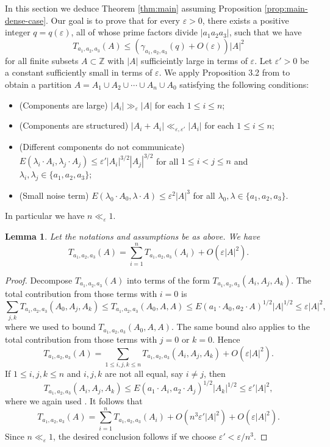 \documentclass[12pt, notitlepage]{amsart}
\numberwithin{equation}{section}
\def\Z{\mathbb Z}
\newcommand{\eps}{\varepsilon}
\newtheorem{lemma}[theorem]{Lemma}
\theoremstyle{remark}
\theoremstyle{definition}
\theoremstyle{remark}
\numberwithin{equation}{section}
\begin{document}
In this section we deduce Theorem \ref{thm:main} assuming Proposition \ref{prop:main-dense-case}. Our goal is to prove that for every $\eps > 0$, there exists a positive integer $q = q(\eps)$, all of whose prime factors divide $|a_1a_2a_3|$, such that we have
$$
T_{a_1,a_2,a_3}(A) \leq (\gamma_{a_1,a_2,a_3}(q) + O(\eps)) |A|^2
$$
for all finite subsets $A \subset \Z$ with $|A|$ sufficieintly large in terms of $\eps$.
Let $\eps'>0$ be a constant sufficiently small in terms of $\eps$. We apply Proposition 3.2 from \cite{green2008maximal} to obtain a partition $A = A_1 \cup A_2 \cup \cdots \cup A_n \cup A_0$ satisfying the following conditions:
\begin{itemize}
\item (Components are large) $|A_i| \gg_{\eps} |A|$ for each $1 \leq i \leq n$;
\item (Components are structured) $|A_i+A_i| \ll_{\eps,\eps'} |A_i|$ for each $1 \leq i \leq n$;
\item (Different components do not communicate) $E(\lambda_i\cdot A_i, \lambda_j \cdot A_j) \leq \eps' |A_i|^{3/2}|A_j|^{3/2}$ for all $1 \leq i < j \leq n$ and $\lambda_i,\lambda_j \in \{a_1, a_2, a_3\}$;
\item (Small noise term) $E(\lambda_0\cdot A_0, \lambda \cdot A) \leq \eps^2 |A|^3$ for all $\lambda_0,\lambda \in \{a_1, a_2, a_3\}$.
\end{itemize}
In particular we have $n \ll_{\eps} 1$.

\begin{lemma}\label{lem:TA-TAi}
Let the notations and assumptions be as above. We have
$$
T_{a_1,a_2,a_3}(A) = \sum_{i=1}^n T_{a_1,a_2,a_3}(A_i) + O(\eps |A|^2).
$$
\end{lemma}

\begin{proof}
Decompose $T_{a_1,a_2,a_3}(A)$ into terms of the form $T_{a_1,a_2,a_3}(A_i, A_j, A_k)$. The total contribution from those terms with $i=0$ is
$$
\sum_{j,k} T_{a_1,a_2,a_3}(A_0, A_j, A_k) \leq T_{a_1,a_2,a_3}(A_0, A, A) \leq E(a_1\cdot A_0, a_2 \cdot A)^{1/2}|A|^{1/2} \leq \eps |A|^2,
$$
where we used \cite[Lemma 2.3]{Aa} to bound $T_{a_1,a_2,a_3}(A_0, A, A)$. The same bound also applies to the total contribution from those terms with $j=0$ or $k=0$. Hence
$$
T_{a_1,a_2,a_3}(A) = \sum_{1 \leq i,j,k \leq n} T_{a_1,a_2,a_3}(A_i,A_j,A_k) + O(\eps |A|^2).
$$
If $1 \leq i,j,k \leq n$ and $i,j,k$ are not all equal, say $i \neq j$, then
$$
T_{a_1,a_2,a_3}(A_i,A_j,A_k) \leq E(a_1\cdot A_i, a_2\cdot A_j)^{1/2} |A_k|^{1/2} \leq \eps' |A|^2,
$$
where we again used  \cite[Lemma 2.3]{Aa}. It follows that
$$
T_{a_1,a_2,a_3}(A) = \sum_{i=1}^nT_{a_1,a_2,a_3}(A_i) + O(n^3\eps' |A|^2) + O(\eps |A|^2).
$$
Since $n \ll_{\eps}1$, the desired conclusion follows if we choose $\eps' < \eps/n^3$.
\end{proof}
\end{document}

